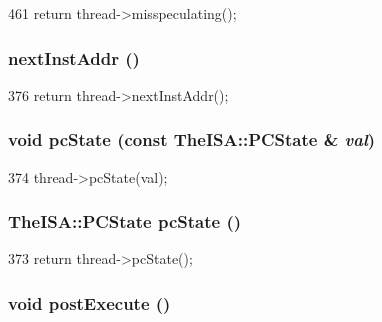\begin{DoxyCode}
461 { return thread->misspeculating(); }
\end{DoxyCode}
\hypertarget{classBaseSimpleCPU_aceec6e28772f91b3cc921c0e3927b0c2}{
\subsubsection[{nextInstAddr}]{ nextInstAddr ()}}
\label{classBaseSimpleCPU_aceec6e28772f91b3cc921c0e3927b0c2}



\begin{DoxyCode}
376 { return thread->nextInstAddr(); }
\end{DoxyCode}
\hypertarget{classBaseSimpleCPU_a5e9cfc754c9ef9b7db875ce89871944e}{
\subsubsection[{pcState}]{\setlength{\rightskip}{0pt plus 5cm}void pcState (const TheISA::PCState \& {\em val})}}
\label{classBaseSimpleCPU_a5e9cfc754c9ef9b7db875ce89871944e}



\begin{DoxyCode}
374 { thread->pcState(val); }
\end{DoxyCode}
\hypertarget{classBaseSimpleCPU_a827fb3454585cf4c620f4fd341966317}{
\subsubsection[{pcState}]{\setlength{\rightskip}{0pt plus 5cm}TheISA::PCState pcState ()}}
\label{classBaseSimpleCPU_a827fb3454585cf4c620f4fd341966317}



\begin{DoxyCode}
373 { return thread->pcState(); }
\end{DoxyCode}
\hypertarget{classBaseSimpleCPU_a86cfcf0bbf35e6f79ccf03bd9436f633}{
\subsubsection[{postExecute}]{\setlength{\rightskip}{0pt plus 5cm}void postExecute ()}}
\label{classBaseSimpleCPU_a86cfcf0bbf35e6f79ccf03bd9436f633}



